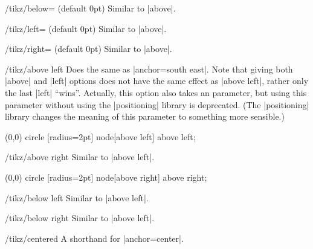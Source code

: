 \begin{key}{/tikz/below= (default 0pt)}
    Similar to |above|.
\end{key}

\begin{key}{/tikz/left= (default 0pt)}
    Similar to |above|.
\end{key}

\begin{key}{/tikz/right= (default 0pt)}
    Similar to |above|.
\end{key}

\begin{key}{/tikz/above left}
    Does the same as |anchor=south east|. Note that giving both |above| and
    |left| options does not have the same effect as |above left|, rather only
    the last |left| ``wins''. Actually, this option also takes an 
    parameter, but using this parameter without using the |positioning| library
    is deprecated. (The |positioning| library changes the meaning of this
    parameter to something more sensible.)
\begin{codeexample}[]
\tikz \fill (0,0) circle [radius=2pt] node[above left] {above left};
\end{codeexample}
\end{key}

\begin{key}{/tikz/above right}
    Similar to  |above left|.
\begin{codeexample}[]
\tikz \fill (0,0) circle [radius=2pt] node[above right] {above right};
\end{codeexample}
\end{key}

\begin{key}{/tikz/below left}
    Similar to |above left|.
\end{key}

\begin{key}{/tikz/below right}
    Similar to |above left|.
\end{key}

\begin{key}{/tikz/centered}
    A shorthand for |anchor=center|.
\end{key}


